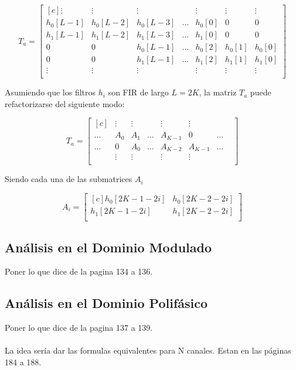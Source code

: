 \begin{equation}
	T_a=
	\begin{bmatrix*}[c]
		\vdots & \vdots & \vdots & & \vdots & \vdots & \vdots\\
		h_0[L-1] & h_0[L-2] & h_0[L-3] & \hdots & h_0[0] & 0 & 0 \\
		h_1[L-1] & h_1[L-2] & h_1[L-3] & \hdots & h_1[0] & 0 & 0 \\
		0 & 0 & h_0[L-1] & \hdots & h_0[2] & h_0[1] & h_0[0] \\
		0 & 0 & h_1[L-1] & \hdots & h_1[2] & h_1[1] & h_1[0] \\
		\vdots & \vdots & \vdots & & \vdots & \vdots & \vdots \\
	\end{bmatrix*}
\end{equation}

Asumiendo que los filtros $h_i$ son FIR de largo $L=2K$, la matriz $T_a$ puede refactorizarse del siguiente modo:

\begin{equation}
	T_a=
	\begin{bmatrix*}[c]
		 & \vdots & \vdots &  & \vdots & \vdots & &\\
		\hdots & A_0 & A_1 & \hdots & A_{K-1} & 0 & \hdots  \\
		\hdots & 0 & A_0 & \hdots & A_{K-2} & A_{K-1} & \hdots  \\
		 & \vdots & \vdots &  & \vdots & \vdots & &\\		
	\end{bmatrix*}
\end{equation}

Siendo cada una de las submatrices $A_i$

\begin{equation}
	A_i=
	\begin{bmatrix*}[c]
		h_0[2K-1-2i] & h_0[2K-2-2i] \\
		h_1[2K-1-2i] & h_1[2K-2-2i] \\
	\end{bmatrix*}
\end{equation}

\subsection{Análisis en el Dominio Modulado}

Poner lo que dice de la pagina 134 a 136.

\subsection{Análisis en el Dominio Polifásico}

Poner lo que dice de la pagina 137 a 139.

\paragraph{}
La idea sería dar las formulas equivalentes para N canales. Estan en las páginas 184 a 188.
